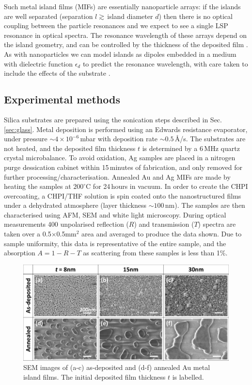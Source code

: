 Such metal island films (MIFs) are essentially nanoparticle arrays: if the islands are well separated (separation $l \gtrsim\,	$island diameter $d$) then there is no optical coupling between the particle resonances and we expect to see a single LSP resonance in optical spectra. The resonance wavelength of these arrays depend on the island geometry, and can be controlled by the thickness of the deposited film \cite{Walter2006, Sennett1950, Gupta2002, Gadenne2002, Lee1992}. As with nanoparticles we can model islands as dipoles embedded in a medium with dielectric function $\epsilon_d$ to predict the resonance wavelength, with care taken to include the effects of the substrate \cite{Yamaguchi1960, Yamaguchi1972, Yamaguchi1973, Doremus1966}.

\subsection{Experimental methods}
Silica substrates are prepared using the sonication steps described in Sec.\,\ref{sec:glass}. Metal deposition is performed using an Edwards resistance evaporator, under pressure $\sim4\times10^{-6}$\,mbar with deposition rate $\sim0.5$\,\AA/s. The substrates are not heated, and the deposited film thickness $t$ is determined by a 6\,MHz quartz crystal microbalance. To avoid oxidation, Ag samples are placed in a nitrogen purge dessication cabinet within 15\,minutes of fabrication, and only removed for further processing/characterisation. Annealed Au and Ag MIFs are made by heating the samples at $200^{\circ}$C for 24\,hours in vacuum. In order to create the CHPI overcoating, a CHPI/THF solution is spin coated onto the nanostructured films under a dehydrated atmosphere (layer thickness $\sim100$\,nm). The samples are then characterised using AFM, SEM and white light microscopy. During optical measurements 400 unpolarised reflection ($R$) and transmission ($T$) spectra are taken over a 0.5$\times$0.5mm$^{2}$ area and averaged to produce the data shown. Due to sample uniformity, this data is representative of the entire sample, and the absorption $A = 1 - R - T$ as scattering from these samples is less than 1\%.

\begin{figure}[h!] 
\centering    
\includegraphics[width=\textwidth]{Fig1}
\caption{SEM images of (a-c) as-deposited and (d-f) annealed Au metal island films. The initial deposited film thickness $t$ is labelled.}
\label{6Fig1}
\end{figure}
